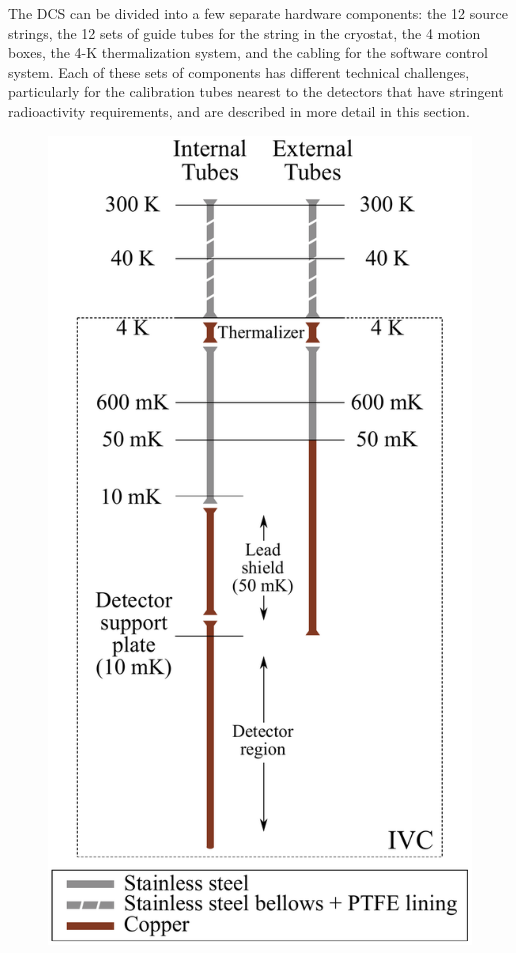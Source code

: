 The DCS can be divided into a few separate hardware components: the 12 source strings, the 12 sets of guide tubes for the string in the cryostat, the 4 motion boxes, the 4-K thermalization system, and the cabling for the software control system.
Each of these sets of components has different technical challenges, particularly for the calibration tubes nearest to the detectors that have stringent radioactivity requirements, and are described in more detail in this section.


\begin{figure}[htbp]
    \centering
    \includegraphics[height=0.4\paperheight]{Figures/thermal_coupling.pdf}

\end{figure}
